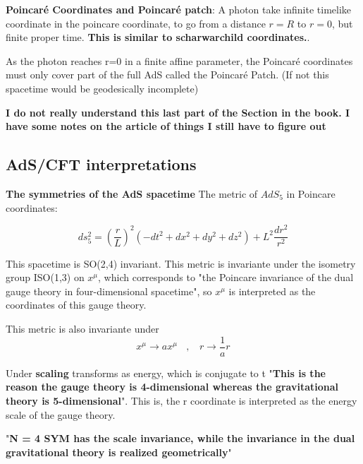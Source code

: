 \documentclass[12pt]{article}
\begin{document}
\textbf{Poincaré Coordinates and Poincaré patch}: A photon take infinite timelike coordinate in the poincare coordinate, to go from a distance \( r=R \) to \( r=0 \), but finite proper time. \textbf{This is similar to scharwarchild coordinates.}.

As the photon reaches r=0 in a finite affine parameter, the Poincaré coordinates must only cover part of the full AdS called the Poincaré Patch. (If not this spacetime would be geodesically incomplete)

\vspace{.5cm}

\textbf{I do not really understand this last part of the Section in the book. I have some notes on the article of things I still have to figure out}

\subsection{AdS/CFT interpretations}

\textbf{The symmetries of the AdS spacetime} The metric of \( AdS_5 \) in Poincare coordinates:

\begin{equation}
    ds_5^2 = \left(\frac{r}{L}\right)^2(-dt^2 + dx^2 + dy^2 + dz^2) + L^2\frac{dr^2}{r^2}
\end{equation}

This spacetime is SO(2,4) invariant. This metric is invariante under the isometry group ISO(1,3) on \(x^\mu \), which corresponds to "the Poincare invariance of the dual gauge theory in four-dimensional spacetime", so \( x^\mu \) is interpreted as the coordinates of this gauge theory.

\vspace{.5cm}

This metric is also invariante under
\begin{equation}
    x^\mu \longrightarrow ax^\mu ~~~~,~~~~ r \longrightarrow \frac{1}{a}r
\end{equation}

Under \textbf{scaling} transforms as energy, which is conjugate to t "\textbf{This is the reason the gauge theory is 4-dimensional whereas the gravitational theory is 5-dimensional}". This is, the r coordinate is interpreted as the energy scale of the gauge theory.

\vspace{.5cm}

"\textbf{N = 4 SYM has the scale invariance, while the invariance in the dual gravitational theory is realized geometrically}"
\end{document}
